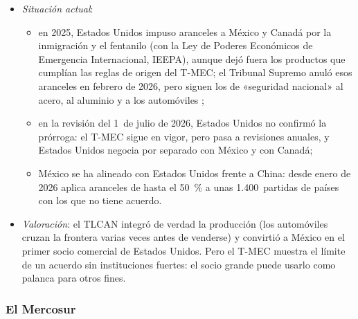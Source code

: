 \documentclass[11pt]{article}
\begin{document}
\begin{itemize}
\begin{itemize}
\begin{itemize}
    \item y una \emph{revisión conjunta} a los 6~años (artículo~34.7): si los 3~confirman su continuidad, el tratado se prorroga 16~años; si no, se revisa cada año y expira en 2036.
    \end{itemize}
  \end{itemize}
\item \emph{Situación actual}:
  \begin{itemize}
  \item en 2025, Estados Unidos impuso aranceles a México y Canadá por la inmigración y el fentanilo (con la Ley de Poderes Económicos de Emergencia Internacional, IEEPA), aunque dejó fuera los productos que cumplían las reglas de origen del T-MEC; el Tribunal Supremo anuló esos aranceles en febrero de 2026, pero siguen los de «seguridad nacional» al acero, al aluminio y a los automóviles\nocite{JonesDay2026IEEPA} ;
  \item en la revisión del 1~de julio de 2026, Estados Unidos no confirmó la prórroga: el T-MEC sigue en vigor, pero pasa a revisiones anuales, y Estados Unidos negocia por separado con México y con Canadá\nocite{IISD2026TMEC};
  \item México se ha alineado con Estados Unidos frente a China: desde enero de 2026 aplica aranceles de hasta el 50~\% a unas 1.400~partidas de países con los que no tiene acuerdo\nocite{Expansion2026Aranceles}.
  \end{itemize}
\item \emph{Valoración}: el TLCAN integró de verdad la producción (los automóviles cruzan la frontera varias veces antes de venderse) y convirtió a México en el primer socio comercial de Estados Unidos. Pero el T-MEC muestra el límite de un acuerdo sin instituciones fuertes: el socio grande puede usarlo como palanca para otros fines.
\end{itemize}

\subsubsection{El Mercosur}\label{sec:mercosur}
\end{document}
